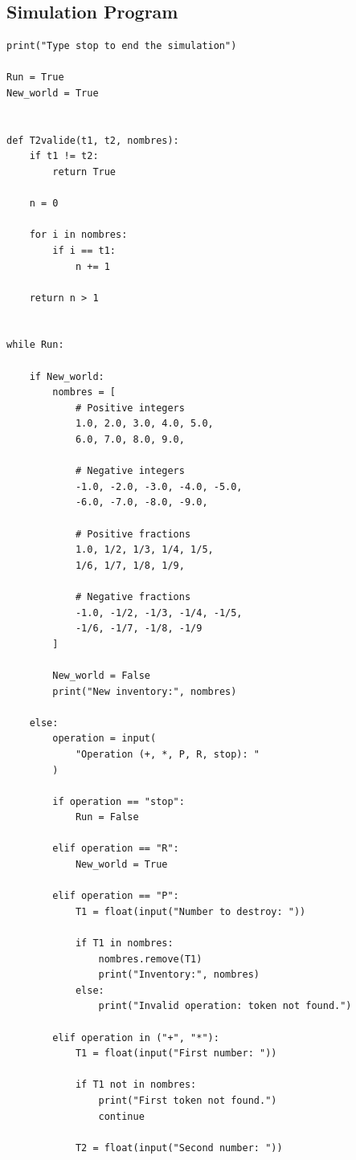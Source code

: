 \documentclass[12pt,a4paper]{article}
\begin{document}
\subsection{Simulation Program}

\begin{lstlisting}
print("Type stop to end the simulation")

Run = True
New_world = True


def T2valide(t1, t2, nombres):
    if t1 != t2:
        return True

    n = 0

    for i in nombres:
        if i == t1:
            n += 1

    return n > 1


while Run:

    if New_world:
        nombres = [
            # Positive integers
            1.0, 2.0, 3.0, 4.0, 5.0,
            6.0, 7.0, 8.0, 9.0,

            # Negative integers
            -1.0, -2.0, -3.0, -4.0, -5.0,
            -6.0, -7.0, -8.0, -9.0,

            # Positive fractions
            1.0, 1/2, 1/3, 1/4, 1/5,
            1/6, 1/7, 1/8, 1/9,

            # Negative fractions
            -1.0, -1/2, -1/3, -1/4, -1/5,
            -1/6, -1/7, -1/8, -1/9
        ]

        New_world = False
        print("New inventory:", nombres)

    else:
        operation = input(
            "Operation (+, *, P, R, stop): "
        )

        if operation == "stop":
            Run = False

        elif operation == "R":
            New_world = True

        elif operation == "P":
            T1 = float(input("Number to destroy: "))

            if T1 in nombres:
                nombres.remove(T1)
                print("Inventory:", nombres)
            else:
                print("Invalid operation: token not found.")

        elif operation in ("+", "*"):
            T1 = float(input("First number: "))

            if T1 not in nombres:
                print("First token not found.")
                continue

            T2 = float(input("Second number: "))


\end{lstlisting}
\end{document}
